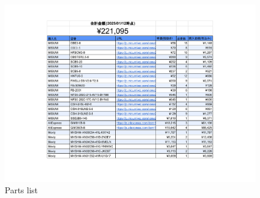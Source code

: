 \begin{figure}
  \includegraphics[width=14cm]{images/product/rist.pdf}
  \caption{Parts list}
  \label{fig:parts}
\end{figure}
\clearpage
\newpage